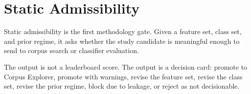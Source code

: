\section{Static Admissibility}

Static admissibility is the first methodology gate. Given a feature set, class set, and prior regime, it asks whether the study candidate is meaningful enough to send to corpus search or classifier evaluation.

The output is not a leaderboard score. The output is a decision card: promote to Corpus Explorer, promote with warnings, revise the feature set, revise the class set, revise the prior regime, block due to leakage, or reject as not decisionable.

